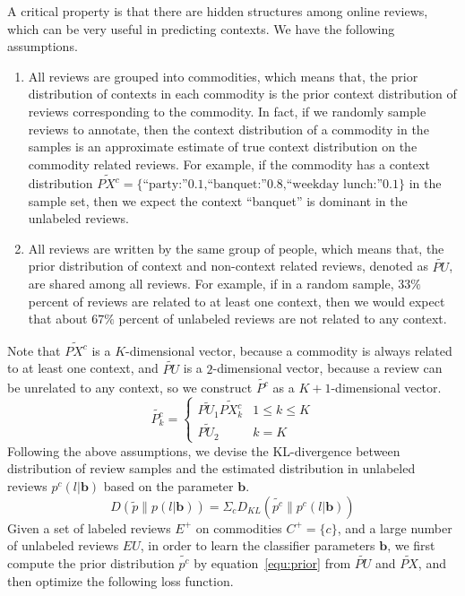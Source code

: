 \documentclass[preprint,12pt]{elsarticle}
\begin{document}
A critical property is that there are hidden structures among online reviews, which can be very useful in predicting contexts. We have the following assumptions.
\begin{enumerate}
  \item All reviews are grouped into commodities, which means that, the prior distribution of contexts in each commodity is the prior context distribution of reviews corresponding to the commodity. In fact, if we randomly sample reviews to annotate, then the context distribution of a commodity in the samples is an approximate estimate of true context distribution on the commodity related reviews. For example, if the commodity has a context distribution $\tilde{PX^c}=\{\textrm{``party:''0.1,``banquet:''0.8,``weekday lunch:''0.1}\}$ in the sample set, then we expect the context ``banquet'' is dominant in the unlabeled reviews.
  \item All reviews are written by the same group of people, which means that, the prior distribution of context and non-context related reviews, denoted as $\tilde{PU}$, are shared among all reviews. For example, if in a random sample, $33\%$ percent of reviews are related to at least one context, then we would expect that about $67\%$ percent of unlabeled reviews are not related to any context.
\end{enumerate}
 Note that $\tilde{PX^c}$ is a $K$-dimensional vector, because a commodity is always related to at least one context, and $\tilde{PU}$ is a $2$-dimensional vector, because a review can be unrelated to any context, so we construct $\tilde{P^c}$ as a $K+1$-dimensional vector.
\begin{equation}\label{equ:prior}
\tilde{P_k^c}=
\left\{
\begin{array}{cc}
\tilde{PU_1} \tilde{PX^c_k}& 1\leq k\leq K\\
\tilde{PU_2} &  k = K
\end{array} \right.
\end{equation}
Following the above assumptions, we devise the KL-divergence between distribution of review samples and the estimated distribution in unlabeled reviews $p^c(l|\mathbf{b})$ based on the parameter $\mathbf{b}$.
\begin{equation}\label{equ:KL}
  D(\tilde{p}\|p(l|\mathbf{b}))\!=\!\Sigma_{c}D_{KL}(\tilde{p^c}\|p^c(l|\mathbf{b}))
\end{equation}
Given a set of labeled reviews $E^+$ on commodities $C^+=\{c\}$, and a large number of unlabeled reviews $EU$, in order to learn the classifier parameters $\mathbf{b}$, we first compute the prior distribution $\tilde{p^c}$ by equation~\ref{equ:prior} from $\tilde{PU}$ and $\tilde{PX}$, and then optimize the following loss function.
\end{document}

